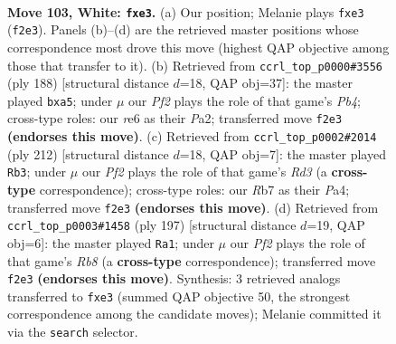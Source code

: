 \documentclass[11pt]{article}
\begin{document}
\clearpage

\begin{figure}[p]\centering
\begin{subfigure}{0.46\textwidth}\centering
\resizebox{\linewidth}{!}{%
\newchessgame
\chessboard[
  setfen={1B5k/1R6/4r3/7P/8/4pp2/5P2/3K4 w - - 0 103},
  showmover=false,
  pgfstyle=straightmove, color=movearrow, markmove={f2-e3}
]}
\caption{}
\end{subfigure}\hfill
\begin{subfigure}{0.46\textwidth}\centering
\resizebox{\linewidth}{!}{%
\newchessgame
\chessboard[
  setfen={8/3R4/2p3k1/p3K3/1P6/6P1/P7/8 w - - 0 95},
  showmover=false,
  pgfstyle=straightmove, color=movearrow, markmove={b4-a5}
]}
\caption{}
\end{subfigure}
\\[4pt]
\begin{subfigure}{0.46\textwidth}\centering
\resizebox{\linewidth}{!}{%
\newchessgame
\chessboard[
  setfen={8/1b4p1/4r3/6P1/P5k1/3R2p1/8/2R3K1 w - - 0 107},
  showmover=false,
  pgfstyle=straightmove, color=movearrow, markmove={d3-b3}
]}
\caption{}
\end{subfigure}\hfill
\begin{subfigure}{0.46\textwidth}\centering
\resizebox{\linewidth}{!}{%
\newchessgame
\chessboard[
  setfen={8/1k6/4K3/pP6/P4R2/8/8/1r6 b - - 96 99},
  showmover=false,
  pgfstyle=straightmove, color=movearrow, markmove={b1-a1}
]}
\caption{}
\end{subfigure}
\caption{\textbf{Move 103, White: \texttt{fxe3}.} (a) Our position; Melanie plays \texttt{fxe3} (\texttt{f2e3}). Panels (b)--(d) are the retrieved master positions whose correspondence most drove this move (highest QAP objective among those that transfer to it). (b) Retrieved from \texttt{ccrl\_top\_p0000\#3556} (ply 188) [structural distance $d$=18, QAP obj=37]: the master played \texttt{bxa5}; under $\mu$ our \emph{Pf2} plays the role of that game's \emph{Pb4}; cross-type roles: our \emph{r}e6 as their \emph{P}a2; transferred move \texttt{f2e3} \textbf{(endorses this move)}. (c) Retrieved from \texttt{ccrl\_top\_p0002\#2014} (ply 212) [structural distance $d$=18, QAP obj=7]: the master played \texttt{Rb3}; under $\mu$ our \emph{Pf2} plays the role of that game's \emph{Rd3} (a \textbf{cross-type} correspondence); cross-type roles: our \emph{R}b7 as their \emph{P}a4; transferred move \texttt{f2e3} \textbf{(endorses this move)}. (d) Retrieved from \texttt{ccrl\_top\_p0003\#1458} (ply 197) [structural distance $d$=19, QAP obj=6]: the master played \texttt{Ra1}; under $\mu$ our \emph{Pf2} plays the role of that game's \emph{Rb8} (a \textbf{cross-type} correspondence); transferred move \texttt{f2e3} \textbf{(endorses this move)}. Synthesis: 3 retrieved analogs transferred to \texttt{fxe3} (summed QAP objective 50, the strongest correspondence among the candidate moves); Melanie committed it via the \texttt{search} selector.}
\label{fig:thought-m204}
\end{figure}
\end{document}

